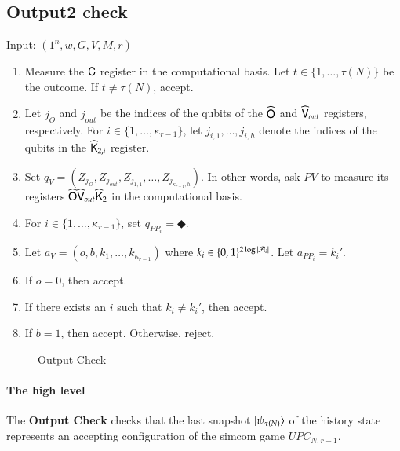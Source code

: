 \subsection{Output2 check}
\label{sec:output_check}


\vspace{10pt}
\begin{center}
\begin{mdframed}
    Input: $(1^n,w,G,V,M,r)$
    \begin{enumerate}
		\item Measure the ${\mathsf{C}}$ register in the computational basis. Let $t \in \{1,\ldots,\tau(N)\}$ be the outcome. If $t \neq \tau(N)$, accept.
		
		\item Let $j_O$ and $j_{out}$ be the indices of the qubits of the $\widehat{{\mathsf{O}}}$ and $\widehat{{\mathsf{V}}}_{out}$ registers, respectively. For $i \in \{1,\ldots,\kappa_{r-1}\}$, let $j_{i,1},\ldots,j_{i,h}$ denote the indices of the qubits in the $\widehat{{\mathsf{K}}}_{2,i}$ register. 
		\item Set $q_V = (Z_{j_O},Z_{j_{out}},Z_{j_{1,1}},\ldots,Z_{j_{\kappa_{r-1},h}})$. In other words, ask $PV$ to measure its registers $\widehat{{\mathsf{O}}} \widehat{{\mathsf{V}}}_{out} \widehat{{\mathsf{K}}}_2$ in the computational basis. 
		\item For $i \in \{1,\ldots,\kappa_{r-1}\}$, set $q_{PP_i} = \Diamondblack$. 
		\item Let $a_V = (o,b,k_1,\ldots,k_{\kappa_{r-1}})$ where $k_i \in \{0,1\}^{2\log |\mathcal A_i|}$. Let $a_{PP_i} = k_i'$. 
		\item If $o = 0$, then accept.
		\item If there exists an $i$ such that $k_i \neq k_i'$, then accept.
		\item If $b = 1$, then accept. Otherwise, reject. 
	\end{enumerate}    
\end{mdframed}
\end{center}
\begin{figure}[H]
\caption{Output Check}
\label{fig:output_check}
\end{figure}


\paragraph{The high level} The \textbf{Output Check} checks that the last snapshot $|\psi_{\tau(N)}\rangle$ of the history state represents an accepting configuration of the simcom game $UPC_{N,r-1}$. 

